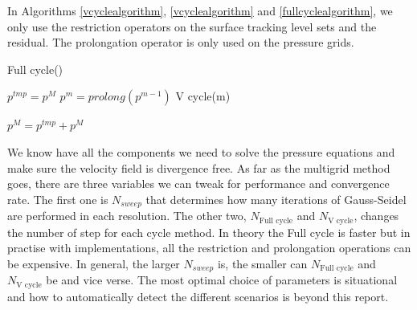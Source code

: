 In Algorithms \ref{vcyclealgorithm}, \ref{vcyclealgorithm} and \ref{fullcyclealgorithm}, we only use the restriction operators on the surface tracking level sets and the residual. The prolongation operator is only used on the pressure grids. 

\begin{algorithm}
\caption{Full cycle()}
\begin{algorithmic}[1]

\STATE $p^{tmp} = p^M$
\STATE $p^m = prolong(p^{m-1})$
\ENDIF
\STATE V cycle(m)

\ENDFOR

\STATE $p^M = p^{tmp} + p^M$

\end{algorithmic}
\label{fullcyclealgorithm}
\end{algorithm}

We know have all the components we need to solve the pressure equations and make sure the velocity field is divergence free. As far as the multigrid method goes, there are three variables we can tweak for performance and convergence rate. The first one is $N_{sweep}$ that determines how many iterations of Gauss-Seidel are performed in each resolution. The other two, $N_{\text{Full cycle}}$ and $N_\text{V cycle}$, changes the number of step for each cycle method. In theory the Full cycle is faster but in practise with implementations, all the restriction and prolongation operations can be expensive. In general, the larger $N_{sweep}$ is, the smaller can $N_{\text{Full cycle}}$ and $N_\text{V cycle}$ be and vice verse. The most optimal choice of parameters is situational and how to automatically detect the different scenarios is beyond this report. 

